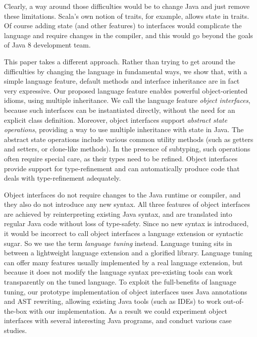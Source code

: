 \noindent Clearly, a way around those difficulties would be to
change Java and just remove these limitations. Scala's own
notion of traits, for example, allows state in traits. Of course adding
state (and other features) to interfaces would complicate the language
and require changes in the compiler, and this would go beyond the
goals of Java 8 development team.

This paper takes a different approach. Rather than trying to get
around the difficulties by changing the language in fundamental ways,
we show that, with a simple language feature, default methods and
interface inheritance are in fact very expressive. Our proposed
language feature enables powerful object-oriented idioms, using
multiple inheritance. We call the language feature \emph{object
  interfaces}, because such interfaces can be instantiated directly,
without the need for an explicit class definition. Moreover, object
interfaces support \emph{abstract state operations}, providing a way
to use multiple inheritance with state in Java. The abstract state
operations include various common utility methods (such as getters and
setters, or clone-like methods). In the presence of subtyping, such
operations often require special care, as their types need to be
refined. Object interfaces provide support for type-refinement and can
automatically produce code that deals with type-refinement
adequately. %

Object interfaces do not require changes to the Java runtime or compiler, 
and they also do not introduce any new syntax. All three features of object interfaces are
achieved by reinterpreting existing Java syntax, and are translated
into regular Java code without loss of type-safety. Since no new
syntax is introduced, it would be incorrect to call object interfaces
a language extension or syntactic sugar. So we use the term
\emph{language tuning} instead. Language tuning sits in between a
lightweight language extension and a glorified library. Language
tuning can offer many features usually implemented by a real language
extension, but because it does not modify the language syntax
pre-existing tools can work transparently on the tuned language.  To
exploit the full-benefits of language tuning, our prototype
implementation of object interfaces uses Java annotations and AST
rewriting, allowing existing Java tools (such as IDEs) to work
out-of-the-box with our implementation. As a result we could
experiment object interfaces with several interesting Java programs,
and conduct various case studies.

